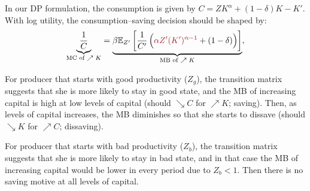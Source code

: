 \begin{solution}
    \par In our DP formulation, the consumption is given by $C = ZK^{\alpha} + (1-\delta)K - K'$.
    With log utility, the consumption–saving decision should be shaped by:
    \begin{eqnarray}
        \underbrace{\frac{1}{C}}_{\text{\scriptsize MC of $\nearrow K$}} =
        \underbrace{\beta \E_{Z'}\left[ \frac{1}{C'}\left({\color{red} \alpha Z' (K')^{\alpha-1}} + (1 - \delta) \right) \right]}_{\text{\scriptsize MB of $\nearrow K$}},
    \end{eqnarray}
    \par \noindent {} For producer that starts with good productivity ($Z_g$),
    the transition matrix suggests that she is more likely to stay in good state,
    and the MB of increasing capital is high at low levels of capital
    (should $\searrow C$ for $\nearrow K$; saving). Then, as levels of capital increases, the MB diminishes so that
    she starts to dissave (should $\searrow K$ for $\nearrow C$; dissaving). \\[6pt]
    \par \noindent {} For producer that starts with bad productivity ($Z_b$), the transition matrix suggests that
    she is more likely to stay in bad state, and in that case the MB of increasing capital would be
    lower in every period due to $Z_b < 1$. Then there is no saving motive at all levels of capital.
\end{solution}